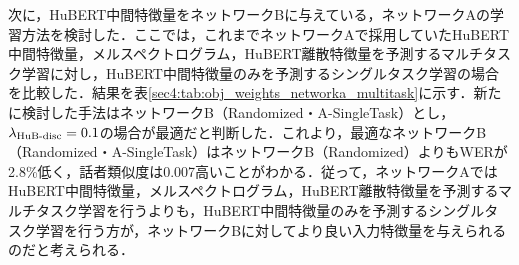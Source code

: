 \begin{table}[b]
    \centering
    \caption{HuBERT Transformer層への入力特徴量を変化させた場合の比較}
    \label{sec4:tab:obj_weights_networkb_input_comparison}
    \begin{center}
        \renewcommand{\arraystretch}{1.0} %
        \setlength{\tabcolsep}{8pt}      %
    \end{center}
\end{table}

次に，HuBERT中間特徴量をネットワークBに与えている，ネットワークAの学習方法を検討した．ここでは，これまでネットワークAで採用していたHuBERT中間特徴量，メルスペクトログラム，HuBERT離散特徴量を予測するマルチタスク学習に対し，HuBERT中間特徴量のみを予測するシングルタスク学習の場合を比較した．結果を表\ref{sec4:tab:obj_weights_networka_multitask}に示す．新たに検討した手法はネットワークB（Randomized・A-SingleTask）とし，$\lambda_{\text{HuB-disc}} = 0.1$の場合が最適だと判断した．これより，最適なネットワークB（Randomized・A-SingleTask）はネットワークB（Randomized）よりもWERが2.8\%低く，話者類似度は0.007高いことがわかる．従って，ネットワークAではHuBERT中間特徴量，メルスペクトログラム，HuBERT離散特徴量を予測するマルチタスク学習を行うよりも，HuBERT中間特徴量のみを予測するシングルタスク学習を行う方が，ネットワークBに対してより良い入力特徴量を与えられるのだと考えられる．

